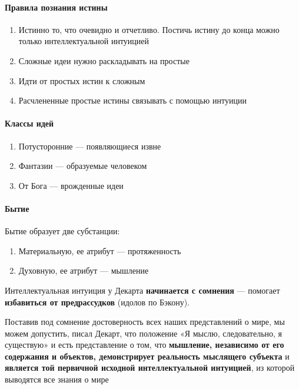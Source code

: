 \documentclass{article}
\begin{document}
\begin{flushleft}
\paragraph{Правила познания истины}

\begin{enumerate}
    \item Истинно то, что очевидно и отчетливо. Постичь истину до конца можно только интеллектуальной интуицией
    \item Сложные идеи нужно раскладывать на простые
    \item Идти от простых истин к сложным
    \item Расчлененные простые истины связывать с помощью интуиции
\end{enumerate}

\paragraph{Классы идей}

\begin{enumerate}
    \item Потусторонние — появляющиеся извне
    \item Фантазии — образуемые человеком
    \item От Бога — врожденные идеи
\end{enumerate}

\paragraph{Бытие}

Бытие образует две субстанции:

\begin{enumerate}
    \item Материальную, ее атрибут — протяженность
    \item Духовную, ее атрибут — мышление
\end{enumerate}

Интеллектуальная интуиция у Декарта \textbf{начинается с сомнения} — помогает \textbf{избавиться от предрассудков} (идолов по Бэкону).

\hfill

Поставив под сомнение достоверность всех наших представлений о мире, мы можем допустить, писал Декарт, что положение «Я мыслю, следовательно, я существую» и есть представление о том, что \textbf{мышление, независимо от его содержания и объектов, демонстрирует реальность мыслящего субъекта} и \textbf{является той первичной исходной интеллектуальной интуицией}, из которой выводятся все знания о мире


\end{flushleft}
\end{document}
